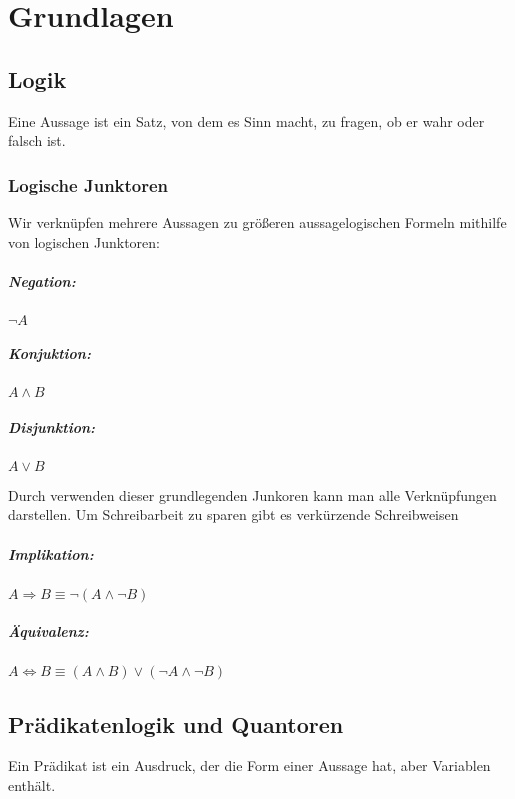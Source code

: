 \chapter{Grundlagen}
\section{Logik}
Eine Aussage ist ein Satz, von dem es Sinn macht, zu fragen, ob er wahr oder falsch ist.

\subsection{Logische Junktoren}
Wir verknüpfen mehrere Aussagen zu größeren aussagelogischen Formeln mithilfe von logischen Junktoren:
\begin{multicols}{3}
  \paragraph{Negation:}
  $\neg A$
  \columnbreak
  \paragraph{Konjuktion:}
  $A \wedge B$
  \columnbreak
  \paragraph{Disjunktion:}
  $A \vee B$
\end{multicols}
Durch verwenden dieser grundlegenden Junkoren kann man alle Verknüpfungen darstellen. Um Schreibarbeit zu sparen gibt es verkürzende Schreibweisen

\paragraph{Implikation:}
$A\Rightarrow B \equiv \neg(A\wedge \neg B)$
\paragraph{Äquivalenz:}
$A\Leftrightarrow B \equiv (A\wedge B)\vee (\neg A\wedge \neg B)$



\section{Prädikatenlogik und Quantoren}
Ein Prädikat ist ein Ausdruck, der die Form einer Aussage hat, aber Variablen enthält.

